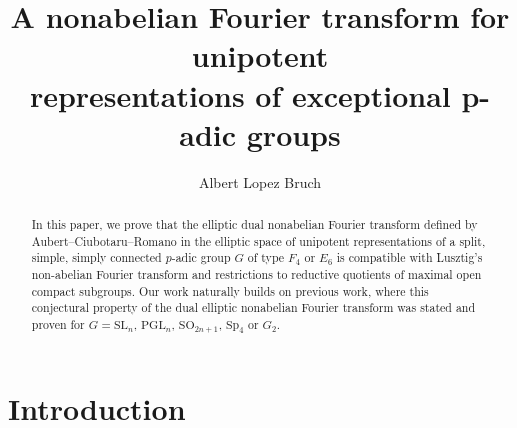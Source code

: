 \documentclass[10pt]{article}
\title{\textbf{A nonabelian Fourier transform for unipotent\\ representations of exceptional p-adic groups}}
\author{Albert Lopez Bruch}
\date{}
\newcommand{\SL}{\mathrm{SL}}
\newcommand{\SO}{\mathrm{SO}}
\newcommand{\Sp}{\mathrm{Sp}}
\newcommand{\PGL}{\mathrm{PGL}}
\theoremstyle{plain}
\theoremstyle{definition}
\begin{document}
\maketitle


\begin{abstract}
In this paper, we prove that the elliptic dual nonabelian Fourier transform defined by Aubert--Ciubotaru--Romano in the elliptic space of unipotent representations of a split, simple, simply connected $p$-adic group $G$ of type $F_4$ or $E_6$ is compatible with Lusztig's non-abelian Fourier transform and restrictions to reductive quotients of maximal open compact subgroups. Our work naturally builds on previous work, where this conjectural property of the dual elliptic nonabelian Fourier transform was stated and proven for $G=\SL_n$, $\PGL_n$, $\SO_{2n+1}$, $\Sp_4$ or $G_2$.
\end{abstract}

\begingroup
{}   %
\tableofcontents
\endgroup

\section{Introduction}

\newpage

\newpage

\newpage

\newpage

%


\newpage

\newpage


\newpage





\newpage


\end{document}
